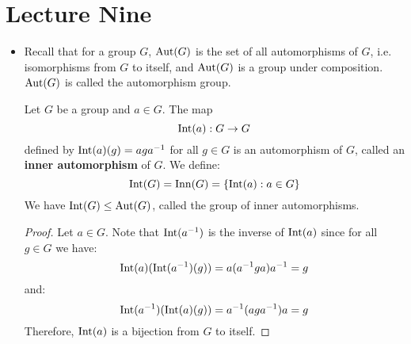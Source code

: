 \section{Lecture Nine}
\begin{itemize}
    \item Recall that for a group $G$, $\operatorname{Aut}(G)$ is the set of all automorphisms of $G$, i.e. isomorphisms from $G$ to itself, and $\operatorname{Aut}(G)$ is a group under composition. $\operatorname{Aut}(G)$ is called the automorphism group.
          \begin{proposition}
              Let $G$ be a group and $a\in G$. The map
              \begin{equation}
                  \operatorname{Int}(a):G \rightarrow G
              \end{equation}
              defined by $\operatorname{Int}(a)(g)=aga^{-1}$ for all $g \in G$ is an automorphism of $G$, called an \textbf{inner automorphism} of $G$. We define:
              \begin{equation}
                  \operatorname{Int}(G) = \operatorname{Inn}(G) = \{\operatorname{Int}(a): a \in G\}
              \end{equation}
              We have $\operatorname{Int}(G) \le \operatorname{Aut}(G)$, called the group of inner automorphisms.
          \end{proposition}
          \begin{proof}
              Let $a\in G$. Note that $\operatorname{Int}(a^{-1})$ is the inverse of $\operatorname{Int}(a)$ since for all $g\in G$ we have:
              \begin{equation}
                  \operatorname{Int}(a)(\operatorname{Int}(a^{-1})(g))=a(a^{-1}ga)a^{-1}=g
              \end{equation}
              and:
              \begin{equation}
                  \operatorname{Int}(a^{-1})(\operatorname{Int}(a)(g))=a^{-1}(aga^{-1})a = g
              \end{equation}
              Therefore, $\operatorname{Int}(a)$ is a bijection from $G$ to itself.


\end{proof}
\end{itemize}
